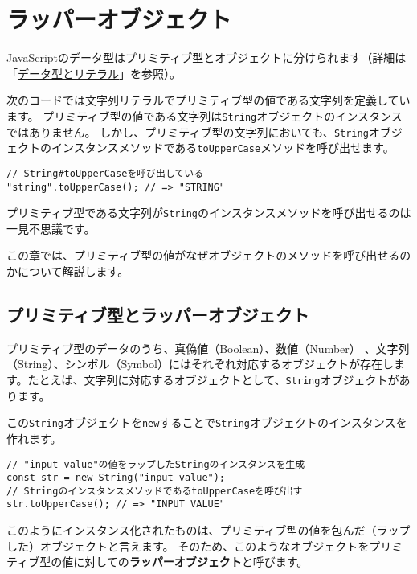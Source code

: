\hypertarget{wrapper-object}{%
\chapter{ラッパーオブジェクト}\label{wrapper-object}}

JavaScriptのデータ型はプリミティブ型とオブジェクトに分けられます（詳細は「\href{../data-type/README.md}{データ型とリテラル}」を参照）。

次のコードでは文字列リテラルでプリミティブ型の値である文字列を定義しています。
プリミティブ型の値である文字列は\texttt{String}オブジェクトのインスタンスではありません。
しかし、プリミティブ型の文字列においても、\texttt{String}オブジェクトのインスタンスメソッドである\texttt{toUpperCase}メソッドを呼び出せます。

\begin{lstlisting}
// String#toUpperCaseを呼び出している
"string".toUpperCase(); // => "STRING"
\end{lstlisting}

プリミティブ型である文字列が\texttt{String}のインスタンスメソッドを呼び出せるのは一見不思議です。

この章では、プリミティブ型の値がなぜオブジェクトのメソッドを呼び出せるのかについて解説します。

\hypertarget{primitive-type-and-wrapper-object}{%
\section{プリミティブ型とラッパーオブジェクト}\label{primitive-type-and-wrapper-object}}

プリミティブ型のデータのうち、真偽値（Boolean）、数値（Number）
、文字列（String）、シンボル（Symbol）にはそれぞれ対応するオブジェクトが存在します。たとえば、文字列に対応するオブジェクトとして、\texttt{String}オブジェクトがあります。

この\texttt{String}オブジェクトを\texttt{new}することで\texttt{String}オブジェクトのインスタンスを作れます。

\begin{lstlisting}
// "input value"の値をラップしたStringのインスタンスを生成
const str = new String("input value");
// StringのインスタンスメソッドであるtoUpperCaseを呼び出す
str.toUpperCase(); // => "INPUT VALUE"
\end{lstlisting}

このようにインスタンス化されたものは、プリミティブ型の値を包んだ（ラップした）オブジェクトと言えます。
そのため、このようなオブジェクトをプリミティブ型の値に対しての\textbf{ラッパーオブジェクト}と呼びます。

